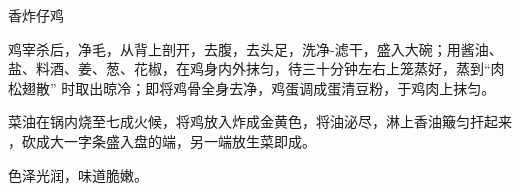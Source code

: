 \begin{recipe}[喇嘛仔鸡]{香炸仔鸡}

\ingredients


\cooking

\step 鸡宰杀后，净毛，从背上剖开，去腹，去头足，洗净-滤干，盛入大碗；用酱油、
盐、料酒、姜、葱、花椒，在鸡身内外抹匀，待三十分钟左右上笼蒸好，蒸到“肉松翅散”
时取出晾冷；即将鸡骨全身去净，鸡蛋调成蛋清豆粉，于鸡肉上抹匀。

\step 菜油在锅内烧至七成火候，将鸡放入炸成金黄色，将油泌尽，淋上香油簸匀扞起来
，砍成大一字条盛入盘的端，另一端放生菜即成。

\notes

色泽光润，味道脆嫩。

\end{recipe}

